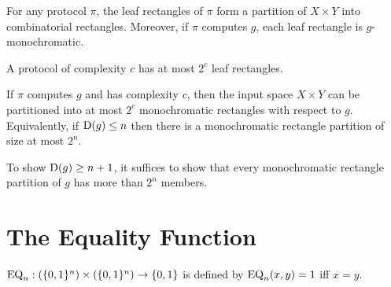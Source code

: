 \begin{lemma}
  \label{lem:leaf_partition}
  \leanok
  For any protocol $\pi$, the leaf rectangles of $\pi$ form a partition of
  $X \times Y$ into combinatorial rectangles.
  Moreover, if $\pi$ computes $g$, each leaf rectangle is $g$-monochromatic.
\end{lemma}

\begin{lemma}
  \label{lem:leaf_card}
  \leanok
  A protocol of complexity $c$ has at most $2^c$ leaf rectangles.
\end{lemma}

\begin{theorem}
  \label{thm:rect_partition}
  \leanok
  If $\pi$ computes $g$ and has complexity $c$, then the input space $X \times Y$
  can be partitioned into at most $2^c$ monochromatic rectangles with respect to $g$.
  Equivalently, if $\mathrm{D}(g) \le n$ then there is a monochromatic rectangle
  partition of size at most $2^n$.
\end{theorem}

\begin{theorem}
  \label{thm:rect_lower_bound}
  \leanok
  To show $\mathrm{D}(g) \ge n+1$, it suffices to show that every monochromatic
  rectangle partition of $g$ has more than $2^n$ members.
\end{theorem}

\chapter{The Equality Function}

\begin{definition}
  \label{def:eq_fn}
  \leanok
  $\mathrm{EQ}_n : (\{0,1\}^n) \times (\{0,1\}^n) \to \{0,1\}$ is defined by
  $\mathrm{EQ}_n(x, y) = 1$ iff $x = y$.
\end{definition}

